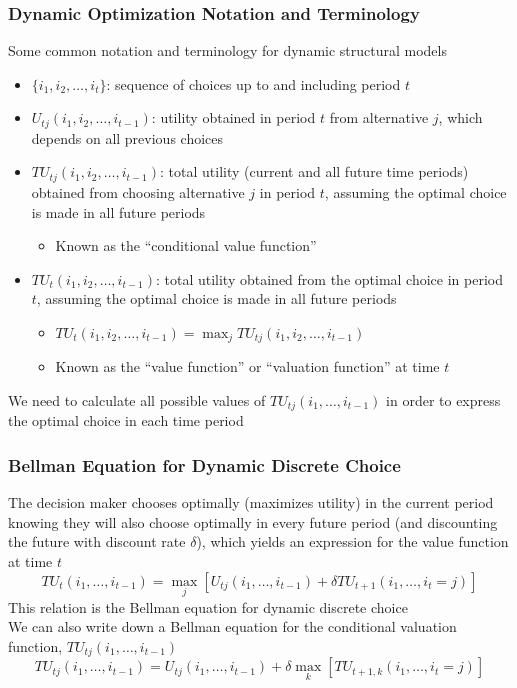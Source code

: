 \documentclass{beamer}
\begin{document}
\begin{frame}\frametitle{Dynamic Optimization Notation and Terminology}
    Some common notation and terminology for dynamic structural models
    \begin{itemize}
        \item $\{i_1, i_2, \ldots, i_t\}$: sequence of choices up to and including period $t$
        \item $U_{tj}(i_1, i_2, \ldots, i_{t-1})$: utility obtained in period $t$ from alternative $j$, which depends on all previous choices
        \item $TU_{tj}(i_1, i_2, \ldots, i_{t-1})$: total utility (current and all future time periods) obtained from choosing alternative $j$ in period $t$, assuming the optimal choice is made in all future periods
        \begin{itemize}
            \item Known as the ``conditional value function''
        \end{itemize}
        \item $TU_t(i_1, i_2, \ldots, i_{t-1})$: total utility obtained from the optimal choice in period $t$, assuming the optimal choice is made in all future periods
        \begin{itemize}
            \item $TU_t(i_1, i_2, \ldots, i_{t-1}) = \max_j TU_{tj}(i_1, i_2, \ldots, i_{t-1})$
            \item Known as the ``value function'' or ``valuation function'' at time $t$
        \end{itemize}
    \end{itemize}
    \vspace{3ex}
    We need to calculate all possible values of $TU_{tj}(i_1, \ldots, i_{t-1})$ in order to express the optimal choice in each time period
\end{frame}

\begin{frame}\frametitle{Bellman Equation for Dynamic Discrete Choice}
    The decision maker chooses optimally (maximizes utility) in the current period knowing they will also choose optimally in every future period (and discounting the future with discount rate $\delta$), which yields an expression for the value function at time $t$
    $$TU_t(i_1, \ldots, i_{t-1}) = \max_j \left[ U_{tj}(i_1, \ldots, i_{t-1}) + \delta TU_{t+1}(i_1, \ldots, i_t = j) \right]$$
    This relation is the Bellman equation for dynamic discrete choice \\
    \vspace{3ex}
    We can also write down a Bellman equation for the conditional valuation function, $TU_{tj}(i_1, \ldots, i_{t-1})$
    $$TU_{tj}(i_1, \ldots, i_{t-1}) = U_{tj}(i_1, \ldots, i_{t-1}) + \delta \max_k \left[ TU_{t+1,k}(i_1, \ldots, i_t = j) \right]$$
\end{frame}
\end{document}
